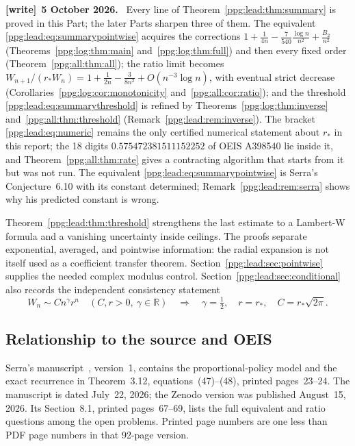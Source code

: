 \documentclass[11pt,letterpaper]{article}
\theoremstyle{remark}\newtheorem{remark}[theorem]{Remark}
\numberwithin{equation}{section}
\newenvironment{writenote}[1][]{\par\smallskip\begingroup\small
 \noindent\textbf{[write]}\if\relax\detokenize{#1}\relax\else~\textbf{#1.}\fi\ }%
 {\par\endgroup\smallskip}
\begin{document}
\begin{writenote}[5 October 2026]
Every line of Theorem~\ref{ppg:lead:thm:summary} is proved in this Part; the later Parts sharpen three of them. The equivalent \eqref{ppg:lead:eq:summarypointwise} acquires the corrections $1+\frac1{4n}-\frac7{540}\frac{\log n}{n^2}+\frac{B_2}{n^2}$ (Theorems~\ref{ppg:log:thm:main} and~\ref{ppg:log:thm:full}) and then every fixed order (Theorem~\ref{ppg:all:thm:all}); the ratio limit becomes $W_{n+1}/(r_*W_n)=1+\frac1{2n}-\frac3{8n^2}+O(n^{-3}\log n)$, with eventual strict decrease (Corollaries~\ref{ppg:log:cor:monotonicity} and~\ref{ppg:all:cor:ratio}); and the threshold \eqref{ppg:lead:eq:summarythreshold} is refined by Theorems~\ref{ppg:log:thm:inverse} and~\ref{ppg:all:thm:threshold} (Remark~\ref{ppg:lead:rem:inverse}). The bracket \eqref{ppg:lead:eq:numeric} remains the only certified numerical statement about $r_*$ in this report; the 18 digits $0.575472381511152252$ of OEIS A398540 lie inside it, and Theorem~\ref{ppg:all:thm:rate} gives a contracting algorithm that starts from it but was not run. The equivalent \eqref{ppg:lead:eq:summarypointwise} is Serra's Conjecture~6.10 with its constant determined; Remark~\ref{ppg:lead:rem:serra} shows why his predicted constant is wrong.
\end{writenote}
Theorem~\ref{ppg:lead:thm:threshold} strengthens the last estimate to a Lambert-W formula and a vanishing uncertainty inside ceilings. The proofs separate exponential, averaged, and pointwise information: the radial expansion is not itself used as a coefficient transfer theorem. Section~\ref{ppg:lead:sec:pointwise} supplies the needed complex modulus control. Section~\ref{ppg:lead:sec:conditional} also records the independent consistency statement
\begin{equation}\label{ppg:lead:eq:conditionalintro}
 W_n\sim Cn^\gamma r^n\quad(C,r>0,\ \gamma\in\mathbb R)
 \quad\Longrightarrow\quad
 \gamma=\tfrac12,\quad r=r_*,\quad C=r_*\sqrt{2\pi}.
\end{equation}

\subsection{Relationship to the source and OEIS}\label{ppg:lead:sub:source}
Serra's manuscript~\cite{serra}, version~1, contains the proportional-policy model and the exact recurrence in Theorem~3.12, equations~(47)--(48), printed pages~23--24. The manuscript is dated July~22, 2026; the Zenodo version was published August~15, 2026. Its Section~8.1, printed pages~67--69, lists the full equivalent and ratio questions among the open problems. Printed page numbers are one less than PDF page numbers in that 92-page version.
\end{document}

